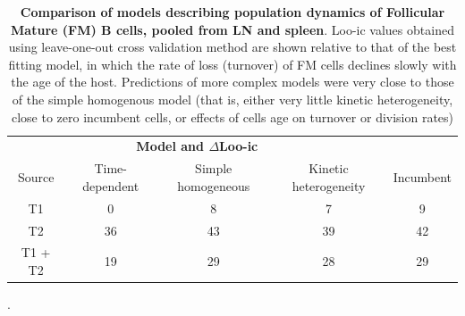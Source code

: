 \documentclass[11pt]{article}
\begin{document}
	\begin{table}[h!]
		\begin{center}
			\renewcommand{\arraystretch}{1.25}
			\begin{tabular}{c c c c c} 
				\toprule 
				\multicolumn{4}{c}{\textbf{Model and $\Delta$Loo-ic}} \\
				\cline{2-5}
				Source &{\small Time-dependent}  & {\small Simple homogeneous} &  {\small Kinetic heterogeneity} & {\small Incumbent} \\ 
				\toprule
				T1      &   0             &              8             &                7              &          9         \\ 
				T2      &   36            &              43            &                39             &          42        \\ 
				T1 + T2 &   19            &              29            &                28             &          29        \\ 
				\hline
				\toprule 
			\end{tabular}
		\end{center}
		\caption{\small \textbf{Comparison of models describing population dynamics of Follicular Mature (FM) B cells, pooled from LN and spleen}. Loo-ic values obtained using leave-one-out cross validation method are shown relative to that of the best fitting model, in which the rate of loss  (turnover) of FM cells declines slowly with the age of the host. Predictions of more complex models were very close to those of the simple homogenous model (that is, either very little kinetic heterogeneity, close to zero incumbent cells, or effects of cells age on turnover or division rates)}. 
		\label{tab:FM-AICs}
	\end{table} 
	
	\vspace{1cm}
	
\end{document}
